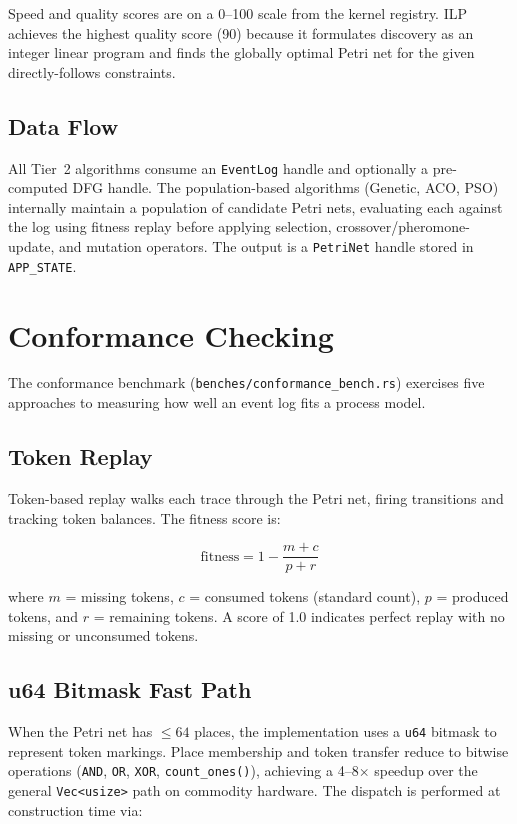 \documentclass[11pt,a4paper]{article}
\begin{document}
Speed and quality scores are on a 0--100 scale from the kernel registry.
ILP achieves the highest quality score (90) because it formulates
discovery as an integer linear program and finds the globally optimal
Petri net for the given directly-follows constraints.

\subsection{Data Flow}

All Tier~2 algorithms consume an \texttt{EventLog} handle and optionally
a pre-computed DFG handle. The population-based algorithms
(Genetic, ACO, PSO) internally maintain a population of candidate
Petri nets, evaluating each against the log using fitness replay before
applying selection, crossover/pheromone-update, and mutation operators.
The output is a \texttt{PetriNet} handle stored in \texttt{APP\_STATE}.

\section{Conformance Checking}
\label{sec:conformance}

The conformance benchmark (\texttt{benches/conformance\_bench.rs}) exercises
five approaches to measuring how well an event log fits a process model.

\subsection{Token Replay}

Token-based replay walks each trace through the Petri net, firing
transitions and tracking token balances. The fitness score is:

\[
  \text{fitness} = 1 - \frac{m + c}{p + r}
\]

where $m$ = missing tokens, $c$ = consumed tokens (standard count),
$p$ = produced tokens, and $r$ = remaining tokens.
A score of 1.0 indicates perfect replay with no missing or unconsumed tokens.

\subsection{u64 Bitmask Fast Path}

When the Petri net has $\leq 64$ places, the implementation uses a
\texttt{u64} bitmask to represent token markings. Place membership and
token transfer reduce to bitwise operations (\texttt{AND}, \texttt{OR},
\texttt{XOR}, \texttt{count\_ones()}), achieving a 4--8$\times$ speedup
over the general \texttt{Vec<usize>} path on commodity hardware.
The dispatch is performed at construction time via:
\end{document}

